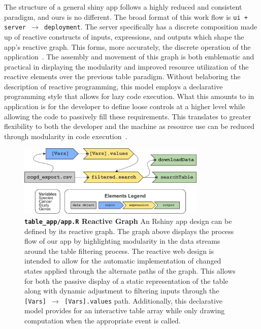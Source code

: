 \documentclass[10pt]{report}
\begin{document}
The structure of a general shiny app follows a highly reduced and consistent paradigm, and ours is no different. The broad format of this work flow is \texttt{ui + server $\rightarrow$ deployment}. The server specifically has a discrete composition made up of reactive constructs of inputs, expressions, and outputs which shape the app's reactive graph. This forms, more accurately, the discrete operation of the application~\cite{wickhamMasteringShinyBook}. The assembly and movement of this graph is both emblematic and practical in displaying the modularity and improved resource utilization of the reactive elements over the previous table paradigm. Without belaboring the description of reactive programming, this model employs a declarative programming style that allows for lazy code execution. What this amounts to in application is for the developer to define loose controls at a higher level while allowing the code to passively fill these requirements. This translates to greater flexibility to both the developer and the machine as resource use can be reduced through modularity in code execution~\cite{jwlloydPracticalAdvantagesDeclarative1994}.

\begin{figure}[H]
    \center{}
    \includegraphics[width=0.8\textwidth]{fig/reactive_graph.pdf}
    \caption[\texttt{table\_app/app.R} Reactive Graph]{\textbf{\texttt{table\_app/app.R} Reactive Graph} An Rshiny app design can be defined by its reactive graph. The graph above displays the process flow of our app by highlighting modularity in the data streams around the table filtering process. The reactive web design is intended to allow for the automatic implementation of changed states applied through the alternate paths of the graph. This allows for both the passive display of a static representation of the table along with dynamic adjustment to filtering inputs through the \texttt{[Vars] $\rightarrow$ [Vars].values} path. Additionally, this declarative model provides for an interactive table array while only drawing computation when the appropriate event is called.}\label{fig:reactiveGraph}
\end{figure}
\end{document}
